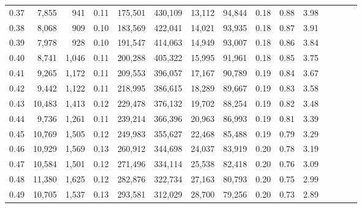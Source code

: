 \begin{tabular}{rrrcrrrrrrrrrrr}
0.37 &   7,855 &    941 &                                       0.11 &  175,501 &  430,109 &   13,112 &   94,844 &  0.18 &  0.88 &                         3.98 \\
0.38 &   8,068 &    909 &                                       0.10 &  183,569 &  422,041 &   14,021 &   93,935 &  0.18 &  0.87 &                         3.91 \\
0.39 &   7,978 &    928 &                                       0.10 &  191,547 &  414,063 &   14,949 &   93,007 &  0.18 &  0.86 &                         3.84 \\
0.40 &   8,741 &  1,046 &                                       0.11 &  200,288 &  405,322 &   15,995 &   91,961 &  0.18 &  0.85 &                         3.75 \\
0.41 &   9,265 &  1,172 &                                       0.11 &  209,553 &  396,057 &   17,167 &   90,789 &  0.19 &  0.84 &                         3.67 \\
0.42 &   9,442 &  1,122 &                                       0.11 &  218,995 &  386,615 &   18,289 &   89,667 &  0.19 &  0.83 &                         3.58 \\
0.43 &  10,483 &  1,413 &                                       0.12 &  229,478 &  376,132 &   19,702 &   88,254 &  0.19 &  0.82 &                         3.48 \\
0.44 &   9,736 &  1,261 &                                       0.11 &  239,214 &  366,396 &   20,963 &   86,993 &  0.19 &  0.81 &                         3.39 \\
0.45 &  10,769 &  1,505 &                                       0.12 &  249,983 &  355,627 &   22,468 &   85,488 &  0.19 &  0.79 &                         3.29 \\
0.46 &  10,929 &  1,569 &                                       0.13 &  260,912 &  344,698 &   24,037 &   83,919 &  0.20 &  0.78 &                         3.19 \\
0.47 &  10,584 &  1,501 &                                       0.12 &  271,496 &  334,114 &   25,538 &   82,418 &  0.20 &  0.76 &                         3.09 \\
0.48 &  11,380 &  1,625 &                                       0.12 &  282,876 &  322,734 &   27,163 &   80,793 &  0.20 &  0.75 &                         2.99 \\
0.49 &  10,705 &  1,537 &                                       0.13 &  293,581 &  312,029 &   28,700 &   79,256 &  0.20 &  0.73 &                         2.89 \\

\end{tabular}
